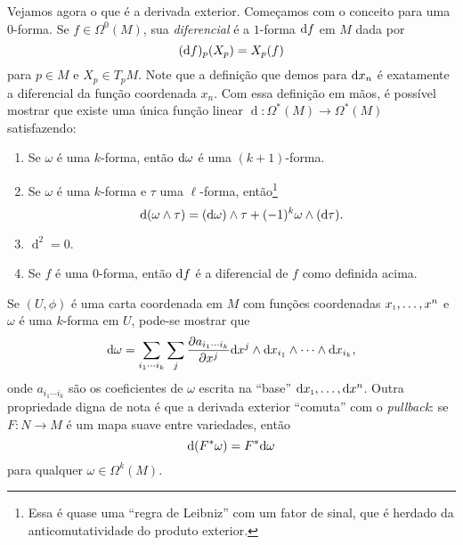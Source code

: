 Vejamos agora o que é a derivada exterior. Começamos com o conceito para uma $0$-forma. Se $f \in \Omega^0(M)$, sua \textit{diferencial} é a $1$-forma ${\operatorname{d}}{f}$ em $M$ dada por
\[
({\operatorname{d}}{f})_p(X_p) = X_p(f)
\]
para $p \in M$ e $X_p \in T_pM$. Note que a definição que demos para ${\operatorname{d}}{x_n}$ é exatamente a diferencial da função coordenada $x_n$. Com essa definição em mãos, é possível mostrar que existe uma única função linear $\operatorname{d}: \Omega^*(M) \longrightarrow \Omega^*(M)$ satisfazendo:
\begin{enumerate}
	\item Se $\omega$ é uma $k$-forma, então ${\operatorname{d}}{\omega}$ é uma $(k+1)$-forma.
	\item Se $\omega$ é uma $k$-forma e $\tau$ uma $\ell$-forma, então\footnote{Essa é quase uma ``regra de Leibniz'' com um fator de sinal, que é herdado da anticomutatividade do produto exterior.} 
	\[
	{\operatorname{d}}{(\omega \wedge \tau)} = ({\operatorname{d}}{\omega}) \wedge \tau + (-1)^k \omega \wedge ({\operatorname{d}}{\tau}).
	\]
	\item $\operatorname{d}^2 = 0$.
	\item Se $f$ é uma $0$-forma, então ${\operatorname{d}}{f}$ é a diferencial de $f$ como definida acima.
\end{enumerate}
Se $(U,\phi)$ é uma carta coordenada em $M$ com funções coordenadas $\sub x1,\dots,x^n$ e $\omega$ é uma $k$-forma em $U$, pode-se mostrar que
\[
{\operatorname{d}}{\omega} = \sum_{i_1 \dotsb i_k} \sum_j \frac{\partial a_{i_1 \dotsb i_k}}{\partial x^j} {\operatorname{d}}{x^j} \wedge {\operatorname{d}}{x_{i_1}} \wedge \dotsb \wedge {\operatorname{d}}{x_{i_k}},
\]
onde $a_{i_1 \dotsb i_k}$ são os coeficientes de $\omega$ escrita na ``base'' $\de{\sub x1}, \dots, \de{x^n}$. Outra propriedade digna de nota é que a derivada exterior ``comuta'' com o \textit{pullback}: se $F: N \longrightarrow M$ é um mapa suave entre variedades, então
\begin{equation}
	\label{eq: pullback comuta}
	{\operatorname{d}}{(F^*\omega)} = F^*{\operatorname{d}}{\omega}
\end{equation}para qualquer $\omega \in \Omega^k(M)$.

